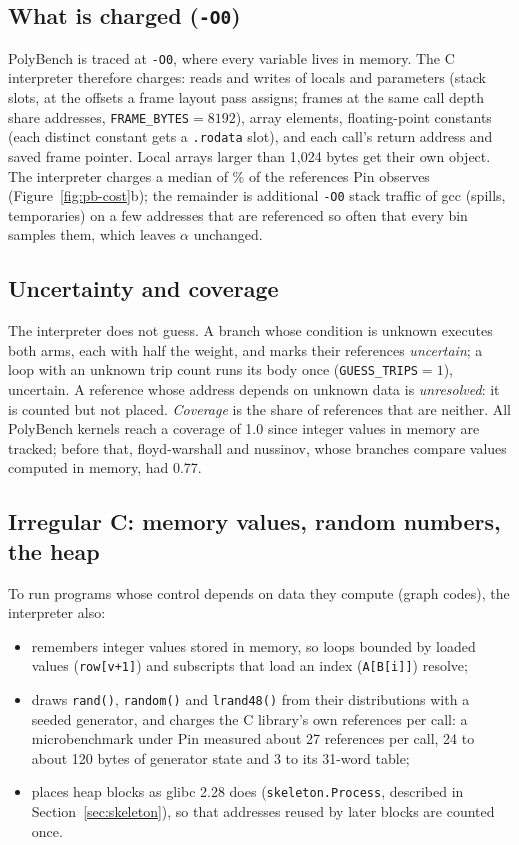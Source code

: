 \documentclass[11pt]{article}
\newcommand{\term}[1]{\emph{#1}}
\newcommand{\code}[1]{\texttt{#1}}
\newcommand{\secref}[1]{Section~\ref{#1}}
\newcommand{\figref}[1]{Figure~\ref{#1}}
\begin{document}
\subsection{What is charged (\code{-O0})}

PolyBench is traced at \code{-O0}, where every variable lives in memory. The C interpreter therefore charges:
reads and writes of locals and parameters (stack slots, at the offsets a frame layout pass assigns; frames at the same
call depth share addresses, \code{FRAME\_BYTES}${}=8192$), array elements, floating-point constants (each distinct
constant gets a \code{.rodata} slot), and each call's return address and saved frame pointer. Local arrays larger
than 1{,}024 bytes get their own object. The interpreter charges a median of \numrefShareMedian\% of the references
Pin observes (\figref{fig:pb-cost}b); the remainder is additional \code{-O0} stack traffic of gcc (spills,
temporaries) on a few addresses that are referenced so often that every bin samples them, which leaves $\alpha$
unchanged.

\subsection{Uncertainty and coverage}

The interpreter does not guess. A branch whose condition is unknown executes both arms, each with half the weight,
and marks their references \term{uncertain}; a loop with an unknown trip count runs its body once
(\code{GUESS\_TRIPS}${}=1$), uncertain. A reference whose address depends on unknown data is \term{unresolved}: it is
counted but not placed. \term{Coverage} is the share of references that are neither. All PolyBench kernels reach a
coverage of 1.0 since integer values in memory are tracked; before that, floyd-warshall and nussinov, whose branches
compare values computed in memory, had 0.77.

\subsection{Irregular C: memory values, random numbers, the heap}
\label{sec:interp-c}
\label{sec:heap}

To run programs whose control depends on data they compute (graph codes), the interpreter also:
\begin{itemize}
\item remembers integer values stored in memory, so loops bounded by loaded values (\code{row[v+1]}) and
subscripts that load an index (\code{A[B[i]]}) resolve;
\item draws \code{rand()}, \code{random()} and \code{lrand48()} from their distributions with a seeded generator,
and charges the C library's own references per call: a microbenchmark under Pin measured about 27 references per
call, 24 to about 120 bytes of generator state and 3 to its 31-word table;
\item places heap blocks as glibc 2.28 does (\code{skeleton.Process}, described in \secref{sec:skeleton}), so that addresses reused by later blocks are counted once.
\end{itemize}
\end{document}
